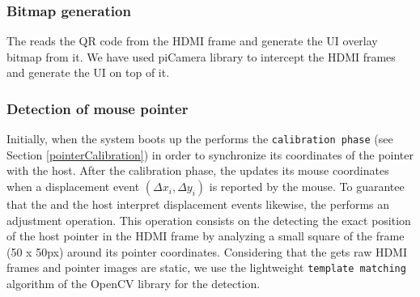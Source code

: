 \subsubsection{\bfseries Bitmap generation}

The \device reads the QR code from the HDMI frame and generate the UI overlay bitmap from it. We have used piCamera library to intercept the HDMI frames and generate the UI on top of it. 

\subsubsection{\bfseries Detection of mouse pointer}
Initially, when the system boots up the \device performs the \texttt{calibration phase} (see Section \ref{pointerCalibration}) in order to synchronize its coordinates of the pointer with the host. After the calibration phase, the \device updates its mouse coordinates when a displacement event $(\Delta x_i, \Delta y_i)$ is reported by the mouse. To guarantee that the \device and the host interpret displacement events likewise, the \device performs an adjustment operation. This operation consists on the \device detecting the exact position of the host pointer in the HDMI frame by analyzing a small square of the frame (50 x 50px) around its pointer coordinates. Considering that the \device gets raw HDMI frames and pointer images are static, we use the lightweight \texttt{template matching} algorithm of the OpenCV library for the detection.

